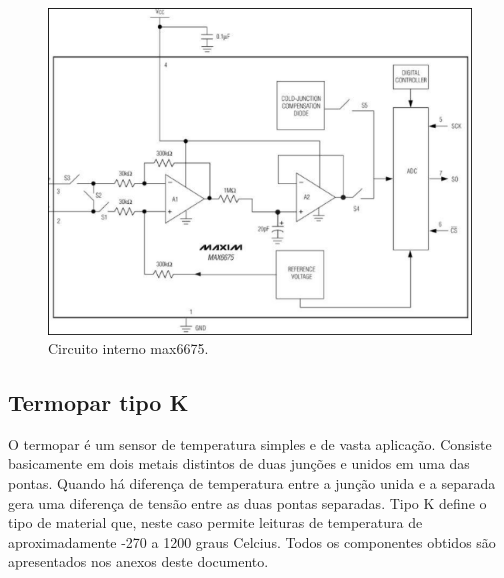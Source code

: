 \begin{figure}[h!]
	\centering
	\includegraphics[keepaspectratio=true,scale= 0.7]{figuras/max6675.PNG}
	\caption{ Circuito interno max6675.}
	\label{Circuitomax}
\end{figure}
\subsection{Termopar tipo K}
O termopar é um sensor de temperatura simples e de vasta aplicação. Consiste basicamente em dois metais distintos de duas junções e unidos em uma das pontas. Quando há diferença de temperatura entre a junção unida e a separada gera uma diferença de tensão entre as duas pontas separadas.
Tipo K define o tipo de material que, neste caso permite leituras de temperatura de aproximadamente -270 a 1200 graus Celcius.
Todos os componentes obtidos são apresentados nos anexos deste documento. 

